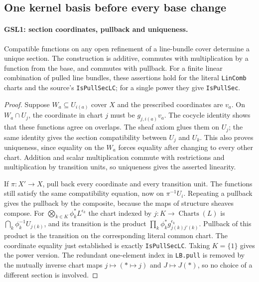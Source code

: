 \subsection{One kernel basis before every base change}

\paragraph{GSL1: section coordinates, pullback and uniqueness.}
\label{claim:GSL1}
Compatible functions on any open refinement of a line-bundle cover
determine a unique section.  The construction is additive, commutes with
multiplication by a function from the base, and commutes with pullback.
For a finite linear combination of pulled line bundles, these assertions
hold for the literal \texttt{LinComb} charts and the source's
\texttt{IsPullSecLC}; for a single power they give \texttt{IsPullSec}.

\begin{proof}
Suppose $W_a\subseteq U_{i(a)}$ cover $X$ and the prescribed coordinates
are $v_a$.  On $W_a\cap U_j$, the coordinate in chart $j$ must be
$g_{j,i(a)}v_a$.  The cocycle identity shows that these functions agree
on overlaps.  The sheaf axiom glues them on $U_j$; the same identity gives
the section compatibility between $U_j$ and $U_k$.  This also proves
uniqueness, since equality on the $W_a$ forces equality after changing
to every other chart.  Addition and scalar multiplication commute with
restrictions and multiplication by transition units, so uniqueness gives
the asserted linearity.

If $\pi:X'\to X$, pull back every coordinate and every transition unit.
The functions still satisfy the same compatibility equation, now on
$\pi^{-1}U_i$.  Repeating a pullback gives the pullback by the composite,
because the maps of structure sheaves compose.  For
$\bigotimes_{k\in K}\phi_k^*L^{\epsilon_k}$ the chart indexed by
$j:K\to\operatorname{Charts}(L)$ is
$\bigcap_k\phi_k^{-1}U_{j(k)}$, and its transition is the product
$\prod_k\phi_k^*g_{j(k)j'(k)}^{\epsilon_k}$.  Pullback of this
product is the transition on the corresponding literal common chart.
The coordinate equality just established is exactly
\texttt{IsPullSecLC}.  Taking $K=\{1\}$ gives the power version.
The redundant one-element index in \texttt{LB.pull} is removed by the
mutually inverse chart maps $j\mapsto(\ast\mapsto j)$ and
$J\mapsto J(\ast)$, so no choice of a different section is involved.
\end{proof}

